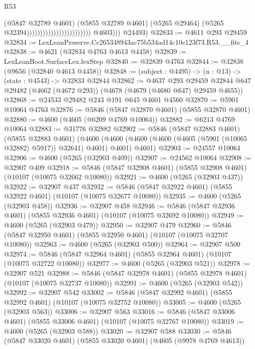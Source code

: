 \begin{lexlean}{R53}
\begin{coremodule}
                                                          (@5847 @32789 @4601)
                                                          (@5855 @32789 @4601)
                                                          (@5265 @29464)
                                                          (@5265 @32394))))))))))))))))))))))))
            @4603)))
      @24493)
@32833 := @4611 @293 @29459
@32834 := LexLeanPreserve.Cc265348943ac75b534ad14c10e123f73.R53.__fits_4
@32838 := @4621 (@32834 @4763 @4613 @4458)
@32839 := LexLeanBoot.SurfaceLex.lexStep
@32840 := @32839 @4763
@32844 := @32838 (@9656 (@32840 @4613 @4458))
@32848 := (subject : @4495) -> (n : @13) -> (state : @4543) -> @32833 @32844
@32862 := @4637
    @293
    @29459
    @32844
    @647
    @29482
    (@4662 (@4672 @293))
    (@4678 (@4679 (@4680 @647) @29459 @4655))
@32868 := @24533 @29482 @243 @191 @645 @4601 @4560
@32870 := @5901 @10064 @4763
@32876 := @5846 (@5847 @32870 @4601) (@5855 @32870 @4601)
@32880 := @4600 (@4605 (@6209 @4769 @10064))
@32882 := @6213 @4769 @10064
@32883 := @31776 @32882
@32902 := @5846
    (@5847 @32883 @4601)
    (@5855 @32883 @4601)
    (@4600 (@4600 (@4600 (@4600 (@4605 (@5901 (@10065 @32882) @5917)) @32641) @4601) @4601) @4601)
@32903 := @24557 @10064
@32906 := @4600 (@5265 (@32903 @409))
@32907 := @24562 @10064
@32908 := @32907 @409
@32918 := @5846 (@5847 @32908 @4601) (@5855 @32908 @4601) (@10107 (@10075 @32662 @10080))
@32921 := @4600 (@5265 (@32903 @437))
@32922 := @32907 @437
@32932 := @5846 (@5847 @32922 @4601) (@5855 @32922 @4601) (@10107 (@10075 @32677 @10080))
@32935 := @4600 (@5265 (@32903 @458))
@32936 := @32907 @458
@32946 := @5846 (@5847 @32936 @4601) (@5855 @32936 @4601) (@10107 (@10075 @32692 @10080))
@32949 := @4600 (@5265 (@32903 @479))
@32950 := @32907 @479
@32960 := @5846 (@5847 @32950 @4601) (@5855 @32950 @4601) (@10107 (@10075 @32707 @10080))
@32963 := @4600 (@5265 (@32903 @500))
@32964 := @32907 @500
@32974 := @5846 (@5847 @32964 @4601) (@5855 @32964 @4601) (@10107 (@10075 @32722 @10080))
@32977 := @4600 (@5265 (@32903 @521))
@32978 := @32907 @521
@32988 := @5846 (@5847 @32978 @4601) (@5855 @32978 @4601) (@10107 (@10075 @32737 @10080))
@32991 := @4600 (@5265 (@32903 @542))
@32992 := @32907 @542
@33002 := @5846 (@5847 @32992 @4601) (@5855 @32992 @4601) (@10107 (@10075 @32752 @10080))
@33005 := @4600 (@5265 (@32903 @563))
@33006 := @32907 @563
@33016 := @5846 (@5847 @33006 @4601) (@5855 @33006 @4601) (@10107 (@10075 @32767 @10080))
@33019 := @4600 (@5265 (@32903 @588))
@33020 := @32907 @588
@33030 := @5846 (@5847 @33020 @4601) (@5855 @33020 @4601) (@4605 (@9978 @4769 @4613))

\end{coremodule}
\end{lexlean}
